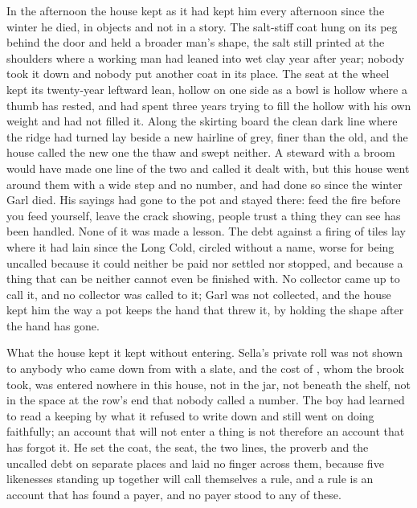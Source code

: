 \scenebreak

In the afternoon the house kept  as it had kept him every afternoon since the winter he died, in objects and not in a story. The salt-stiff coat hung on its peg behind the door and held a broader man's shape, the salt still printed at the shoulders where a working man had leaned into wet clay year after year; nobody took it down and nobody put another coat in its place. The seat at the wheel kept its twenty-year leftward lean, hollow on one side as a bowl is hollow where a thumb has rested, and  had spent three years trying to fill the hollow with his own weight and had not filled it. Along the skirting board the clean dark line where the  ridge had turned lay beside a new hairline of grey, finer than the old, and the house called the new one the thaw and swept neither. A steward with a broom would have made one line of the two and called it dealt with, but this house went around them with a wide step and no number, and had done so since the winter Garl died. His sayings had gone to the pot and stayed there: feed the fire before you feed yourself, leave the crack showing, people trust a thing they can see has been handled. None of it was made a lesson. The debt against a firing of tiles lay where it had lain since the Long Cold, circled without a name, worse for being uncalled because it could neither be paid nor settled nor stopped, and because a thing that can be neither cannot even be finished with. No collector came up  to call it, and no collector was called to it; Garl was not collected, and the house kept him the way a pot keeps the hand that threw it, by holding the shape after the hand has gone.

What the house kept it kept without entering. Sella's private roll was not shown to anybody who came down from  with a slate, and the cost of , whom the brook took, was entered nowhere in this house, not in the jar, not beneath the shelf, not in the space at the row's end that nobody called a number. The boy had learned to read a keeping by what it refused to write down and still went on doing faithfully; an account that will not enter a thing is not therefore an account that has forgot it. He set the coat, the seat, the two lines, the proverb and the uncalled debt on separate places and laid no finger across them, because five likenesses standing up together will call themselves a rule, and a rule is an account that has found a payer, and no payer stood to any of these.

